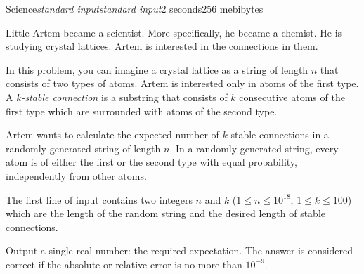 \begin{problem}{Science}{\textsl{standard input}}{\textsl{standard input}}{2 seconds}{256 mebibytes}{}

Little Artem became a scientist. More specifically, he became a chemist. He is studying crystal lattices. Artem is interested in the connections in them.

In this problem, you can imagine a crystal lattice as a string of length $n$ that consists of two types of atoms. Artem is interested only in atoms of the first type. A \textit{$k$-stable connection} is a substring that consists of $k$ consecutive atoms of the first type which are surrounded with atoms of the second type.

Artem wants to calculate the expected number of $k$-stable connections in a randomly generated string of length $n$. In a randomly generated string, every atom is of either the first or the second type with equal probability, independently from other atoms.


\InputFile
The first line of input contains two integers $n$ and $k$ ($1 \le n \le 10^{18}$, $1 \le k \le 100$) which are the length of the random string and the desired length of stable connections.

\OutputFile
Output a single real number: the required expectation. The answer is considered correct if the absolute or relative error is no more than $10^{-9}$.

\Examples

\begin{example}
%
%
%
\end{example}

\end{problem}
